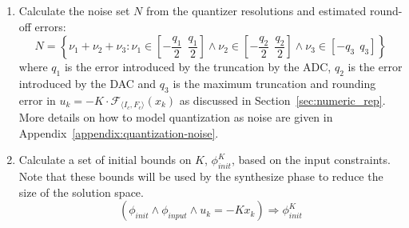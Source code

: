 \documentclass[runningheads,a4paper]{llncs}
\newcommand{\mat}[1]{\boldsymbol{#1}}
\begin{document}
\begin{enumerate}
\begin{enumerate}

\item Calculate the noise set $N$ from the quantizer resolutions and estimated round-off errors: %
%
$$N=\left \{ \nu_1+\nu_2+ \nu_3 : \nu_1 \in \left[-\frac{q_1}{2}\ \ \frac{q_1}{2}\right] 
\wedge \nu_2 \in \left[-\frac{q_2}{2}\ \ \frac{q_2}{2}\right]  \wedge \nu_3 \in \left[-q_3\ \ q_3\right]  \right \}\nonumber$$
%
where  $q_1$ is the error introduced by the truncation by the ADC, $q_2$ is
the error introduced by the DAC and $q_3$ is the maximum truncation and
rounding error in $u_k=-K \cdot \mathcal{F}_{\langle I_c,F_c \rangle}(x_k)$ as
discussed in Section~\ref{sec:numeric_rep}.  More details on how to model
quantization as noise are given in
Appendix~\ref{appendix:quantization-noise}.

\item Calculate a set of initial bounds on $K$, $\phi_\mathit{init}^{K}$,
based on the input constraints.  Note that these bounds will be used by the
{\sc synthesize} phase to reduce the size of the solution space. 
%
$$(\phi_\mathit{init} \wedge \phi_\mathit{input} \wedge u_k=-K x_k)
\Rightarrow \phi_\mathit{init}^{K}$$


\end{enumerate}
\end{enumerate}
\end{document}
